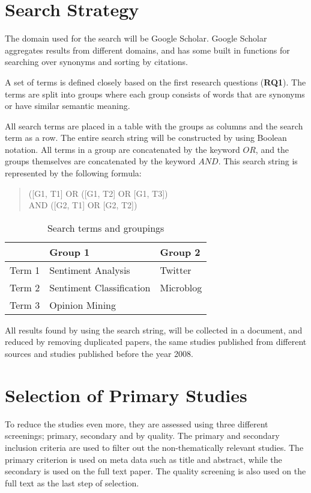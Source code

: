 \section{Search Strategy}

The domain used for the search will be Google Scholar. Google Scholar aggregates results from different domains, and has some built in functions for searching over synonyms and sorting by citations. 

A set of terms is defined closely based on the first research questions (\textbf{RQ1}). The terms are split into groups where each group consists of words that are synonyms or have similar semantic meaning.

All search terms are placed in a table with the groups as columns and the search term as a row. The entire search string will be constructed by using Boolean notation. All terms in a group are concatenated by the keyword $OR$, and the groups themselves are concatenated by the keyword $AND$. This search string is represented by the following formula: 

	
\begin{verse}
	\centering
	([G1, T1] OR ([G1, T2] OR [G1, T3]) \\
	AND ([G2, T1] OR [G2, T2]) 
\end{verse}

\begin{table}[htdp]
\begin{center}
\begin{tabular}{|l|l|l|}\hline

& Group 1 & Group 2  \\\hline
Term 1 & Sentiment Analysis & Twitter \\\hline
Term 2 & Sentiment Classification & Microblog \\\hline
Term 3 & Opinion Mining &  \\\hline

\end{tabular}
\caption{Search terms and groupings}
\end{center}
\label{tab:searchterms}
\end{table}

All results found by using the search string, will be collected in a document, and reduced by removing duplicated papers, the same studies published from different sources and studies published before the year 2008.


\section{Selection of Primary Studies}
To reduce the studies even more, they are assessed using three different screenings; primary, secondary and by quality. The primary and secondary inclusion criteria are used to filter out the non-thematically relevant studies. The primary criterion is used on meta data such as title and abstract, while the secondary is used on the full text paper. The quality screening is also used on the full text as the last step of selection.

